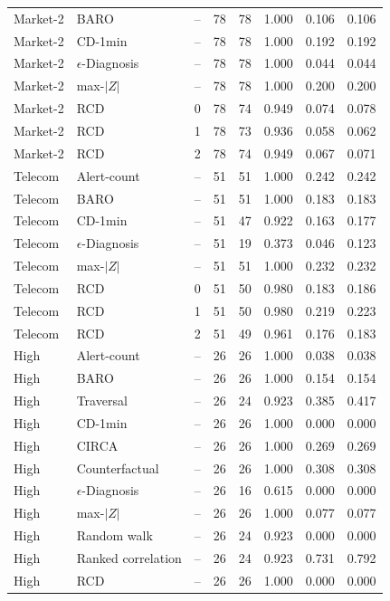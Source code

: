 {\begin{longtable}{llrrrrrr}
Market-2 & BARO & -- & 78 & 78 & 1.000 & 0.106 & 0.106 \\
Market-2 & CD-1min & -- & 78 & 78 & 1.000 & 0.192 & 0.192 \\
Market-2 & $\epsilon$-Diagnosis & -- & 78 & 78 & 1.000 & 0.044 & 0.044 \\
Market-2 & max-$|Z|$ & -- & 78 & 78 & 1.000 & 0.200 & 0.200 \\
Market-2 & RCD & 0 & 78 & 74 & 0.949 & 0.074 & 0.078 \\
Market-2 & RCD & 1 & 78 & 73 & 0.936 & 0.058 & 0.062 \\
Market-2 & RCD & 2 & 78 & 74 & 0.949 & 0.067 & 0.071 \\
Telecom & Alert-count & -- & 51 & 51 & 1.000 & 0.242 & 0.242 \\
Telecom & BARO & -- & 51 & 51 & 1.000 & 0.183 & 0.183 \\
Telecom & CD-1min & -- & 51 & 47 & 0.922 & 0.163 & 0.177 \\
Telecom & $\epsilon$-Diagnosis & -- & 51 & 19 & 0.373 & 0.046 & 0.123 \\
Telecom & max-$|Z|$ & -- & 51 & 51 & 1.000 & 0.232 & 0.232 \\
Telecom & RCD & 0 & 51 & 50 & 0.980 & 0.183 & 0.186 \\
Telecom & RCD & 1 & 51 & 50 & 0.980 & 0.219 & 0.223 \\
Telecom & RCD & 2 & 51 & 49 & 0.961 & 0.176 & 0.183 \\
High & Alert-count & -- & 26 & 26 & 1.000 & 0.038 & 0.038 \\
High & BARO & -- & 26 & 26 & 1.000 & 0.154 & 0.154 \\
High & Traversal & -- & 26 & 24 & 0.923 & 0.385 & 0.417 \\
High & CD-1min & -- & 26 & 26 & 1.000 & 0.000 & 0.000 \\
High & CIRCA & -- & 26 & 26 & 1.000 & 0.269 & 0.269 \\
High & Counterfactual & -- & 26 & 26 & 1.000 & 0.308 & 0.308 \\
High & $\epsilon$-Diagnosis & -- & 26 & 16 & 0.615 & 0.000 & 0.000 \\
High & max-$|Z|$ & -- & 26 & 26 & 1.000 & 0.077 & 0.077 \\
High & Random walk & -- & 26 & 24 & 0.923 & 0.000 & 0.000 \\
High & Ranked correlation & -- & 26 & 24 & 0.923 & 0.731 & 0.792 \\
High & RCD & -- & 26 & 26 & 1.000 & 0.000 & 0.000 \\

\end{longtable}}
